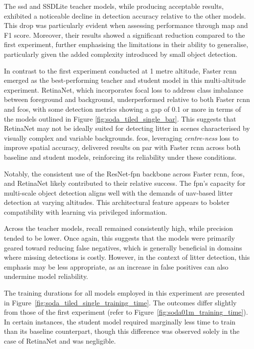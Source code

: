 The \gls{ssd} and SSDLite teacher models, while producing acceptable results, exhibited a noticeable decline in detection accuracy relative to the other models. This drop was particularly evident when assessing performance through \gls{map} and F1 score. Moreover, their results showed a significant reduction compared to the first experiment, further emphasising the limitations in their ability to generalise, particularly given the added complexity introduced by small object detection.

In contrast to the first experiment conducted at 1 metre altitude, Faster \gls{rcnn} emerged as the best-performing teacher and student model in this multi-altitude experiment. RetinaNet, which incorporates focal loss to address class imbalance between foreground and background, underperformed relative to both Faster \gls{rcnn} and \gls{fcos}, with some detection metrics showing a gap of 0.1 or more in terms of the models outlined in Figure \ref{fig:soda_tiled_single_bar}. This suggests that RetinaNet may not be ideally suited for detecting litter in scenes characterised by visually complex and variable backgrounds. \gls{fcos}, leveraging \textit{centre-ness} loss to improve spatial accuracy, delivered results on par with Faster \gls{rcnn} across both baseline and student models, reinforcing its reliability under these conditions.

Notably, the consistent use of the ResNet-\gls{fpn} backbone across Faster \gls{rcnn}, \gls{fcos}, and RetinaNet likely contributed to their relative success. The \gls{fpn}’s capacity for multi-scale object detection aligns well with the demands of \gls{uav}-based litter detection at varying altitudes. This architectural feature appears to bolster compatibility with learning via privileged information.

Across the teacher models, recall remained consistently high, while precision tended to be lower. Once again, this suggests that the models were primarily geared toward reducing false negatives, which is generally beneficial in domains where missing detections is costly. However, in the context of litter detection, this emphasis may be less appropriate, as an increase in false positives can also undermine model reliability.

The training durations for all models employed in this experiment are presented in Figure~\ref{fig:soda_tiled_single_training_time}. The outcomes differ slightly from those of the first experiment (refer to Figure~\ref{fig:soda01m_training_time}). In certain instances, the student model required marginally less time to train than its baseline counterpart, though this difference was observed solely in the case of RetinaNet and was negligible.

